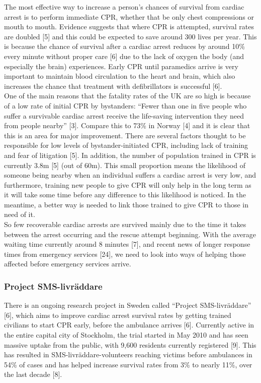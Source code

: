 \documentclass[]{article}
\begin{document}
The most effective way to increase a person’s chances of survival from cardiac arrest is to perform immediate CPR, whether that be only chest compressions or mouth to mouth. Evidence suggests that where CPR is attempted, survival rates are doubled [5] and this could be expected to save around 300 lives per year. This is because the chance of survival after a cardiac arrest reduces by around 10\% every minute without proper care [6] due to the lack of oxygen the body (and especially the brain) experiences. Early CPR until paramedics arrive is very important to maintain blood circulation to the heart and brain, which also increases the chance that treatment with defibrillators is successful [6].\\

One of the main reasons that the fatality rates of the UK are so high is because of a low rate of initial CPR by bystanders: ``Fewer than one in five people who suffer a survivable cardiac arrest receive the life-saving intervention they need from people nearby'' [3]. Compare this to 73\% in Norway [4] and it is clear that this is an area for major improvement. There are several factors thought to be responsible for low levels of bystander-initiated CPR, including lack of training and fear of litigation [5]. In addition, the number of population trained in CPR is currently 3.8m [5] (out of 60m). This small proportion means the likelihood of someone being nearby when an individual suffers a cardiac arrest is very low, and furthermore, training new people to give CPR will only help in the long term as it will take some time before any difference to this likelihood is noticed. In the meantime, a better way is needed to link those trained to give CPR to those in need of it.\\

So few recoverable cardiac arrests are survived mainly due to the time it takes between the arrest occurring and the rescue attempt beginning. With the average waiting time currently around 8 minutes [7], and recent news of longer response times from emergency services [24], we need to look into ways of helping those affected before emergency services arrive.\\
		\subsubsection{Project SMS-livräddare}
		
		There is an ongoing research project in Sweden called ``Project SMS-livräddare'' [6], which aims to improve cardiac arrest survival rates by getting trained civilians to start CPR early, before the ambulance arrives [6]. Currently active in the entire capital city of Stockholm, the trial started in May 2010 and has seen massive uptake from the public, with 9,600 residents currently registered [9]. This has resulted in SMS-livräddare-volunteers reaching victims before ambulances in 54\% of cases and has helped increase survival rates from 3\% to nearly 11\%, over the last decade [8].\\
\end{document}
